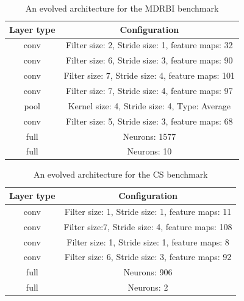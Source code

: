 \documentclass[conference]{IEEEtran}
\begin{document}
\begin{table}[!t]
	\renewcommand{\arraystretch}{1.3}
	\caption{An evolved architecture for the MDRBI benchmark}
	\label{table:EvolvedMDRBICNN}
	\centering
	\begin{tabular}{|c|c|}
		\hline
		Layer type & Configuration\\
		\hline
		conv & Filter size: 2, Stride size: 1, feature maps: 32\\
		\hline
		conv & Filter size: 6, Stride size: 3, feature maps: 90\\
		\hline
		conv & Filter size: 7, Stride size: 4, feature maps: 101\\
		\hline
		conv & Filter size: 7, Stride size: 4, feature maps: 97\\
		\hline
		pool & Kernel size: 4, Stride size: 4, Type: Average\\
		\hline
		conv & Filter size: 5, Stride size: 3, feature maps: 68\\
		\hline
		full & Neurons: 1577\\
		\hline
		full & Neurons: 10\\
		\hline
	\end{tabular}
\end{table}

\begin{table}[!t]
	\renewcommand{\arraystretch}{1.3}
	\caption{An evolved architecture for the CS benchmark}
	\label{table:EvolvedConvexCNN}
	\centering
	\begin{tabular}{|c|c|}
		\hline
		Layer type & Configuration\\
		\hline
		conv & Filter size: 1, Stride size: 1, feature maps: 11\\
		\hline
		conv & Filter size:7, Stride size: 4, feature maps: 108\\
		\hline
		conv & Filter size: 1, Stride size: 1, feature maps: 8\\
		\hline
		conv & Filter size: 6, Stride size: 3, feature maps: 92\\
		\hline
		full & Neurons: 906\\
		\hline
		full & Neurons: 2\\
		\hline
	\end{tabular}
\end{table}
\end{document}
